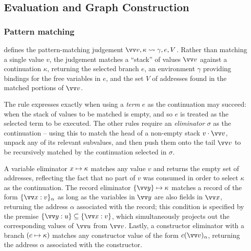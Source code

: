 
\subsection{Evaluation and Graph Construction}
\label{sec:core:semantics}





\subsubsection{Pattern matching}
\label{sec:core:semantics:pattern-matching}
 defines the pattern-matching judgement $\seq{v}, \kappa \match \gamma, e, V$.
Rather than matching a single value $v$, the judgement matches a ``stack'' of values $\seq{v}$ against a
continuation $\kappa$, returning the selected branch $e$, an environment $\gamma$ providing bindings for the
free variables in $e$, and the set $V$ of addresses found in the matched portions of $\seq{v}$.

The  rule expresses exactly when using a \emph{term} $e$ as the continuation may
succeed: when the stack of values to be matched is empty, and so $e$ is treated as the selected term to be
executed. The other rules require an \emph{eliminator} $\sigma$ as the continuation  -- using this to match the head of a non-empty stack $v \cons \seq{v}$, unpack any of its relevant
subvalues, and then push them onto the tail $\seq{v}$ to be recursively matched by the continuation selected
in $\sigma$.

A variable eliminator ${x}\mapsto{\kappa}$ matches any value $v$ and returns the empty set of addresses,
reflecting the fact that no part of $v$ was consumed in order to select $\kappa$ as the continuation. The
record eliminator $\elimRecord{\seq{y}}{\kappa}$ matches a record of the form
$\annot{\exRec{\seq{\bind{x}{v}}}}{\alpha}$ as long as the variables in $\seq{y}$ are also fields in
$\seq{x}$, returning the address $\alpha$ associated with the record; this condition is specified by the
premise $\exRec{\seq{\bind{y}{u}}} \subseteq \exRec{\seq{\bind{x}{v}}}$, which simultaneously projects out the
corresponding values of $\seq{u}$ from $\seq{v}$. Lastly, a constructor eliminator with a branch
$({c}\mapsto{\kappa})$ matches any constructor value of the form $\annot{\exConstr{c}{\seq{v}}}{\alpha}$,
returning the address $\alpha$ associated with the constructor.

